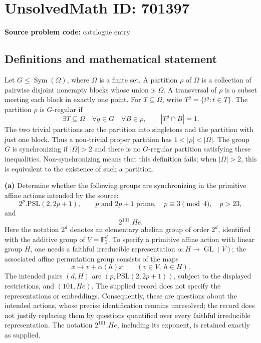 \documentclass[11pt]{article}
\newcommand{\F}{\mathbb{F}}
\begin{document}
\section*{UnsolvedMath ID: 701397}
\textbf{Source problem code:} catalogue entry
\subsection{Definitions and mathematical statement}
Let \(G\leq\operatorname{Sym}(\Omega)\), where \(\Omega\) is a finite set. A partition \(\rho\) of \(\Omega\) is a collection of pairwise disjoint nonempty blocks whose union is \(\Omega\). A transversal of \(\rho\) is a subset meeting each block in exactly one point. For \(T\subseteq\Omega\), write \(T^g=\{t^g:t\in T\}\). The partition \(\rho\) is \(G\)-regular if
\[
\exists T\subseteq\Omega\quad\forall g\in G\quad\forall B\in\rho,\qquad |T^g\cap B|=1.
\]
The two trivial partitions are the partition into singletons and the partition with just one block. Thus a non-trivial proper partition has \(1<|\rho|<|\Omega|\). The group \(G\) is synchronizing if \(|\Omega|>2\) and there is no \(G\)-regular partition satisfying these inequalities. Non-synchronizing means that this definition fails; when \(|\Omega|>2\), this is equivalent to the existence of such a partition.

\textbf{(a)} Determine whether the following groups are synchronizing in the primitive affine actions intended by the source:
\[
2^p.\mathrm{PSL}(2,2p+1),
\qquad p\text{ and }2p+1\text{ prime},\quad
p\equiv3\pmod4,\quad p>23,
\]
and
\[
2^{101}.He.
\]
Here the notation \(2^d\) denotes an elementary abelian group of order \(2^d\), identified with the additive group of \(V=\F_2^d\). To specify a primitive affine action with linear group \(H\), one needs a faithful irreducible representation \(\alpha:H\longrightarrow\operatorname{GL}(V)\); the associated affine permutation group consists of the maps
\[
x\longmapsto v+\alpha(h)x\qquad(v\in V,\ h\in H).
\]
The intended pairs \((d,H)\) are \((p,\mathrm{PSL}(2,2p+1))\), subject to the displayed restrictions, and \((101,He)\). The supplied record does not specify the representations or embeddings. Consequently, these are questions about the intended actions, whose precise identification remains unresolved; the record does not justify replacing them by questions quantified over every faithful irreducible representation. The notation \(2^{101}.He\), including its exponent, is retained exactly as supplied.
\end{document}
